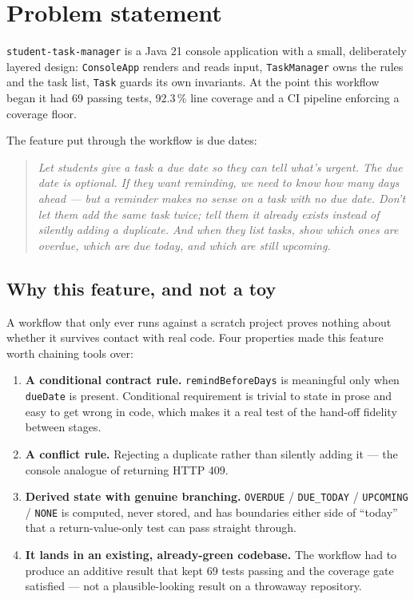 \documentclass[11pt,a4paper]{article}
\newcommand{\code}[1]{\texttt{\small #1}}
\begin{document}
\tableofcontents
\newpage

\section{Problem statement}

\code{student-task-manager} is a Java 21 console application with a small,
deliberately layered design: \code{ConsoleApp} renders and reads input,
\code{TaskManager} owns the rules and the task list, \code{Task} guards its own
invariants. At the point this workflow began it had 69 passing tests, 92.3\,\%
line coverage and a CI pipeline enforcing a coverage floor.

The feature put through the workflow is due dates:

\begin{quote}
\itshape
Let students give a task a due date so they can tell what's urgent. The due
date is optional. If they want reminding, we need to know how many days ahead
--- but a reminder makes no sense on a task with no due date. Don't let them
add the same task twice; tell them it already exists instead of silently adding
a duplicate. And when they list tasks, show which ones are overdue, which are
due today, and which are still upcoming.
\end{quote}

\subsection{Why this feature, and not a toy}

A workflow that only ever runs against a scratch project proves nothing about
whether it survives contact with real code. Four properties made this feature
worth chaining tools over:

\begin{enumerate}
  \item \textbf{A conditional contract rule.} \code{remindBeforeDays} is
        meaningful only when \code{dueDate} is present. Conditional
        requirement is trivial to state in prose and easy to get wrong in
        code, which makes it a real test of the hand-off fidelity between
        stages.
  \item \textbf{A conflict rule.} Rejecting a duplicate rather than silently
        adding it --- the console analogue of returning HTTP 409.
  \item \textbf{Derived state with genuine branching.} \code{OVERDUE} /
        \code{DUE\_TODAY} / \code{UPCOMING} / \code{NONE} is computed, never
        stored, and has boundaries either side of ``today'' that a
        return-value-only test can pass straight through.
  \item \textbf{It lands in an existing, already-green codebase.} The workflow
        had to produce an additive result that kept 69 tests passing and the
        coverage gate satisfied --- not a plausible-looking result on a
        throwaway repository.
\end{enumerate}
\end{document}
